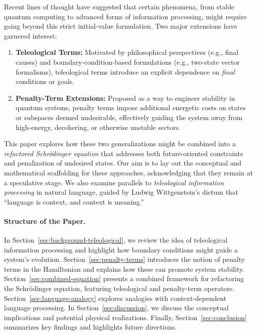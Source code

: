 \documentclass[11pt]{article}
\begin{document}
Recent lines of thought have suggested that certain phenomena, from stable quantum computing to advanced forms of information processing, might require going beyond this strict initial-value formulation. Two major extensions have garnered interest:

\begin{enumerate}
    \item \textbf{Teleological Terms:} Motivated by philosophical perspectives (e.g., final causes) and boundary-condition-based formulations (e.g., two-state vector formalisms), teleological terms introduce an explicit dependence on \emph{final} conditions or goals. 
    \item \textbf{Penalty-Term Extensions:} Proposed as a way to engineer stability in quantum systems, penalty terms impose additional energetic costs on states or subspaces deemed undesirable, effectively guiding the system away from high-energy, decohering, or otherwise unstable sectors.
\end{enumerate}

This paper explores how these two generalizations might be combined into a \emph{refactored Schr\"odinger equation} that addresses both future-oriented constraints and penalization of undesired states. Our aim is to lay out the conceptual and mathematical scaffolding for these approaches, acknowledging that they remain at a speculative stage. We also examine parallels to \emph{teleological information processing} in natural language, guided by Ludwig Wittgenstein’s dictum that ``language is context, and context is meaning.''

\paragraph{Structure of the Paper.} 
In Section~\ref{sec:background-teleological}, we review the idea of teleological information processing and highlight how boundary conditions might guide a system’s evolution. Section~\ref{sec:penalty-terms} introduces the notion of penalty terms in the Hamiltonian and explains how these can promote system stability. Section~\ref{sec:combined-equation} presents a combined framework for refactoring the Schr\"odinger equation, featuring teleological and penalty-term operators. Section~\ref{sec:language-analogy} explores analogies with context-dependent language processing. In Section~\ref{sec:discussion}, we discuss the conceptual implications and potential physical realizations. Finally, Section~\ref{sec:conclusion} summarizes key findings and highlights future directions.
\end{document}
